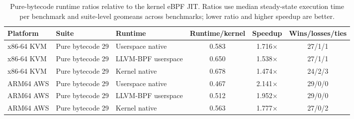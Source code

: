 \begin{table}[t]
\centering
\small
\caption{Pure-bytecode runtime ratios relative to the kernel eBPF JIT. Ratios use median steady-state execution time per benchmark and suite-level geomeans across benchmarks; lower ratio and higher speedup are better.}
\label{tab:char-micro-summary}
\begin{tabular}{@{}lllccc@{}}
\toprule
Platform & Suite & Runtime & Runtime/kernel & Speedup & Wins/losses/ties \\
\midrule
x86-64 KVM & Pure bytecode 29 & Userspace native & 0.583 & 1.716$\times$ & 27/1/1 \\
x86-64 KVM & Pure bytecode 29 & LLVM-BPF userspace & 0.650 & 1.538$\times$ & 27/1/1 \\
x86-64 KVM & Pure bytecode 29 & Kernel native & 0.678 & 1.474$\times$ & 24/2/3 \\
ARM64 AWS & Pure bytecode 29 & Userspace native & 0.467 & 2.141$\times$ & 29/0/0 \\
ARM64 AWS & Pure bytecode 29 & LLVM-BPF userspace & 0.512 & 1.952$\times$ & 29/0/0 \\
ARM64 AWS & Pure bytecode 29 & Kernel native & 0.563 & 1.777$\times$ & 27/0/2 \\
\bottomrule
\end{tabular}
\end{table}
